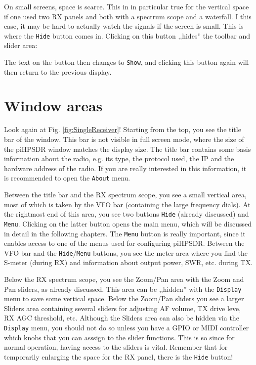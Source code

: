 \documentclass[12pt]{book}
\def\rett#1{\texttt{\color{red}#1}}
\def\bltt#1{\texttt{\color{blue}#1}}
\begin{document}
On small screens, space is scarce. This in in particular true
for the vertical space if one used two RX panels and both
with a spectrum scope and a waterfall. I this case, it may be
hard to actually watch the signals if the screen is small.
This is where the \rett{Hide} button comes in. Clicking on
this button ,,hides'' the toolbar and slider area:


The text on the button then changes to \rett{Show}, and
clicking this button again will then return to the
previous display.

\section{Window areas}

Look again at Fig. \ref{fig:SingleReceiver}! Starting from the
top, you see the title bar of the window. This bar is not visible
in full screen mode, where the size of the piHPSDR window matches
the display size. The title bar contains some basis information
about the radio, e.g.  its type, the protocol used, the  IP
and the hardware address of the radio. If you are really interested
in this information, it is recommended to open the
\bltt{About} menu.

Between the title bar and the RX spectrum scope, you see
a small vertical area, most of  which is taken by the VFO bar
(containing the large frequency dials). At the rightmost
end of this area, you see two buttons \rett{Hide} (already
discussed) and \rett{Menu}. Clicking on the latter button opens
the main menu, which will be discussed in detail in the following
chapters. The \rett{Menu} button is really important, since it
enables access to one of the menus used for configuring piHPSDR.
Between the VFO bar and the \rett{Hide}/\rett{Menu} buttons,
you see the meter area where you find the S-meter (during RX)
and information about output power, SWR, etc. during TX.

Below the RX  spectrum scope, you see the Zoom/Pan area with
the  Zoom and Pan sliders, as already discussed. This area
can be ,,hidden'' with the \bltt{Display} menu to save some
vertical space. Below the
Zoom/Pan sliders you see a larger  Sliders area containing
several sliders for adjusting AF volume, TX  drive leve, 
RX  AGC threshold, etc. Although the Sliders area can also
be hidden via the \bltt{Display} menu, you should not do so
unless you have a GPIO or MIDI controller which knobs that
you can asssign to the slider functions. This is so since
for  normal operation, having access to the sliders is vital.
Remember that for temporarily enlarging the space for
the RX  panel, there is the \rett{Hide} button!
\end{document}
